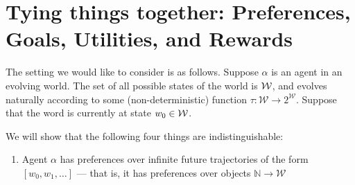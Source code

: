 \documentclass{article}
\begin{document}
%	
%	
%	
%	
%	
%	
	
	
	\section{Tying things together: Preferences, Goals, Utilities, and Rewards}
	
	The setting we would like to consider is as follows. Suppose $\alpha$ is an agent in an evolving world. The set of all possible states of the world is $\cal W$, and evolves naturally according to some (non-deterministic) function $\tau: \mathcal W \to 2^{\mathcal W}$. Suppose that the word is currently at state $w_0 \in \cal W$.
	 
	 We will show that the following four things are indistinguishable:
	 \begin{enumerate}
	 	\item Agent $\alpha$ has preferences over infinite future trajectories of the form $[w_0, w_1, \ldots]$ --- that is, it has preferences over objects $\mathbb N \to \mathcal W$
	 \end{enumerate} 
	
\end{document}

